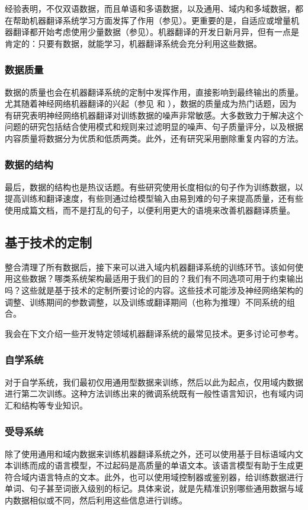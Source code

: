 \documentclass[output=paper]{langscibook}
\begin{document}
经验表明，不仅双语数据，而且单语和多语数据，以及通用、域内和多域数据，都在帮助机器翻译系统学习方面发挥了作用（参见\citep{Saunders2021}）。更重要的是，自适应或增量机器翻译都开始考虑使用少量数据（参见）。机器翻译的开发日新月异，但有一点是肯定的：只要有数据，就能学习，机器翻译系统会充分利用这些数据。


\subsubsection{数据质量}
数据的质量也会在机器翻译系统的定制中发挥作用，直接影响到最终输出的质量。尤其随着神经网络机器翻译的兴起（参见 和 ），数据的质量成为热门话题，因为有研究表明神经网络机器翻译对训练数据的噪声非常敏感\citep{Khayrallah2018}。大多数致力于解决这个问题的研究包括结合使用模式和规则来过滤明显的噪声、句子质量评分，以及根据内容质量将数据分为优质和低质两类。此外，还有研究采用删除重复内容的方法\citep{Khayrallah2018}。


\subsubsection{数据的结构}
最后，数据的结构也是热议话题\citep{Mohiuddin2022}。有些研究使用长度相似的句子作为训练数据，以提高训练和翻译速度，有些则通过给模型输入由易到难的句子来提高质量，还有些使用成篇文档，而不是打乱的句子，以便利用更大的语境来改善机器翻译质量。


\subsection{基于技术的定制}
整合清理了所有数据后，接下来可以进入域内机器翻译系统的训练环节。该如何使用这些数据？哪类系统架构最适用于我们的目的？我们有不同选项可用于约束输出吗？这些就是基于技术的定制所要讨论的内容。这些技术可能涉及神经网络架构的调整、训练期间的参数调整，以及训练或翻译期间（也称为推理）不同系统的组合。

我会在下文介绍一些开发特定领域机器翻译系统的最常见技术。更多讨论可参考\citet[Ch. 13]{Koehn2020}。

\subsubsection{自学系统}
对于自学系统，我们最初仅用通用型数据来训练，然后以此为起点，仅用域内数据进行第二次训练。这种方法训练出来的微调系统既有一般性语言知识，也有域内词汇和结构等专业知识。

\subsubsection{受导系统} 
除了使用通用和域内数据来训练机器翻译系统之外，还可以使用基于目标语域内文本训练而成的语言模型，不过起码是高质量的单语文本。该语言模型有助于生成更符合域内语言特点的文本。此外，也可以使用域控制器或鉴别器，给训练数据进行单词、句子甚至词嵌入级别的标记。具体来说，就是先精准识别哪些通用数据与域内数据相似或不同，然后利用这些信息进行训练。
\end{document}
